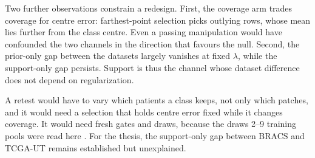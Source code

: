 \documentclass[11pt]{article}
\begin{document}
Two further observations constrain a redesign. First, the coverage arm trades coverage for centre error: farthest-point selection picks outlying rows, whose mean lies further from the class centre. Even a passing manipulation would have confounded the two channels in the direction that favours the null. Second, the prior-only gap between the datasets largely vanishes at fixed $\lambda$, while the support-only gap persists. Support is thus the channel whose dataset difference does not depend on regularization.

A retest would have to vary which patients a class keeps, not only which patches, and it would need a selection that holds centre error fixed while it changes coverage. It would need fresh gates and draws, because the draws 2--9 training pools were read here \citep{dwork2015reusable}. For the thesis, the support-only gap between BRACS and TCGA-UT remains established but unexplained.



\end{document}
